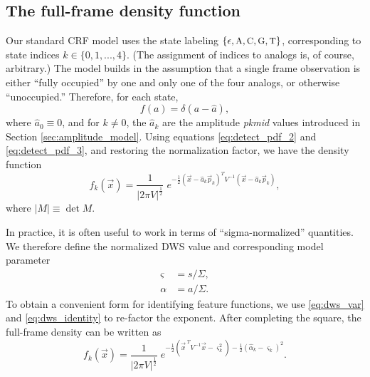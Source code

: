 \documentclass[10pt]{article}
\newcommand{\half}{\frac{1}{2}}
\newcommand{\dws}{{\small DWS}}
\newcommand{\crf}{{\small CRF}}
\newcommand{\fA}{\ensuremath{\text{\small{A}}}}
\newcommand{\fC}{\ensuremath{\text{\small{C}}}}
\newcommand{\fG}{\ensuremath{\text{\small{G}}}}
\newcommand{\fT}{\ensuremath{\text{\small{T}}}}
\begin{document}
\subsection{The full-frame density function}
\label{sec:full_frame_density}
Our standard \crf{} model uses the state labeling $\{\epsilon,\fA,\fC,\fG,\fT\}$, corresponding to state indices $k\in\{0,1,...,4\}$.
(The assignment of indices to analogs is, of course, arbitrary.)
The model builds in the assumption that a single frame observation is either ``fully occupied'' by one and only one of the four analogs, or otherwise ``unoccupied.''
Therefore, for each state,
\begin{equation}
\label{eq:full_amp_density}
f(a) = \delta(a - \hat{a}),
\end{equation}
where $\hat{a}_0 \equiv 0$, and for $k\neq 0$, the $\hat{a}_k$ are the amplitude \emph{pkmid} values introduced in Section \ref{sec:amplitude_model}.
Using equations \eqref{eq:detect_pdf_2} and \eqref{eq:detect_pdf_3}, and restoring the normalization factor, we have the density function
\begin{equation}
f_k(\vec{x}) = \frac{1}{|2\pi V|^\half} \; e^{-\half(\vec{x}-\hat{a}_k\vec{p}_k)^T V^{-1} (\vec{x}-\hat{a}_k\vec{p}_k)}, 	\label{eq:full_density}
\end{equation}
where $|M| \equiv \det M$.

In practice, it is often useful to work in terms of ``sigma-normalized'' quantities.
We therefore define the normalized \dws{} value and corresponding model parameter
\begin{subequations}
\label{eq:sigma_normalization}
\begin{align}
		\varsigma &= s/\Sigma,\\
		\alpha &= a/\Sigma.
\end{align}
\end{subequations}
To obtain a convenient form for identifying feature functions, 
we use \eqref{eq:dws_var} and \eqref{eq:dws_identity} to re-factor the exponent.
After completing the square, the full-frame density can be written as
\begin{equation}
\label{eq:full_density_cam}
f_k(\vec{x}) = \frac{1}{|2\pi V|^\half} \; e^{-\half(\vec{x}^{\;T} V^{-1} \vec{x} - \varsigma_k^2) -\half(\hat{\alpha}_k - \varsigma_k)^2}.
\end{equation}
\end{document}
